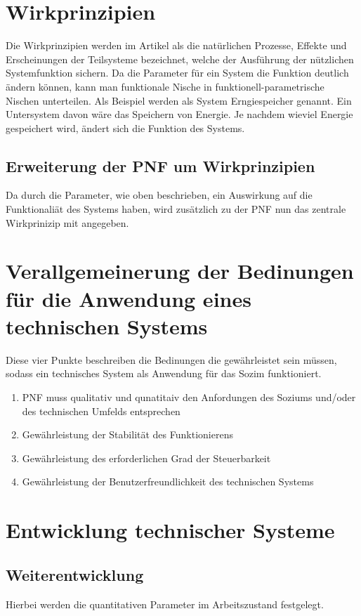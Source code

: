 \documentclass[DIV=22, 10pt, a4paper]{scrartcl}
\begin{document}
    \section{Wirkprinzipien}

    Die Wirkprinzipien werden im Artikel als die natürlichen Prozesse, Effekte und Erscheinungen der Teilsysteme bezeichnet, welche der Ausführung der nützlichen Systemfunktion sichern.
    Da die Parameter für ein System die Funktion deutlich ändern können, kann man funktionale Nische in funktionell-parametrische Nischen unterteilen.
    Als Beispiel werden als System Erngiespeicher genannt. 
    Ein Untersystem davon wäre das Speichern von Energie. 
    Je nachdem wieviel Energie gespeichert wird, ändert sich die Funktion des Systems.

    \subsection{Erweiterung der PNF um Wirkprinzipien}
    Da durch die Parameter, wie oben beschrieben, ein Auswirkung auf die Funktionaliät des Systems haben, wird zusätzlich zu der PNF nun das zentrale Wirkprinizip mit angegeben.

    \section{Verallgemeinerung der Bedinungen für die Anwendung eines technischen Systems}
    Diese vier Punkte beschreiben die Bedinungen die gewährleistet sein müssen, sodass ein technisches System als Anwendung für das Sozim funktioniert.

    \begin{enumerate}
        \item PNF muss qualitativ und qunatitaiv den Anfordungen des Soziums und/oder des technischen Umfelds entsprechen
        \item Gewährleistung der Stabilität des Funktionierens
        \item Gewährleistung des erforderlichen Grad der Steuerbarkeit
        \item Gewährleistung der Benutzerfreundlichkeit des technischen Systems
    \end{enumerate}

    \section{Entwicklung technischer Systeme}

    \subsection{Weiterentwicklung}
        Hierbei werden die quantitativen Parameter im Arbeitszustand festgelegt.
\end{document}
